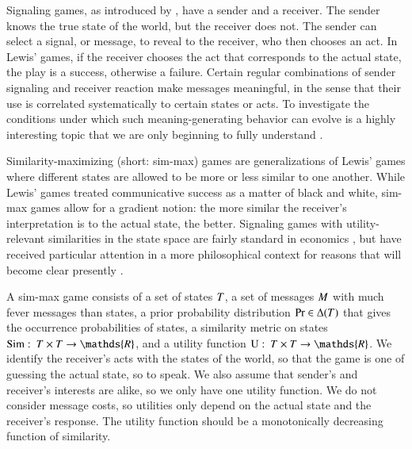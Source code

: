 \documentclass[fleqn,reqno,10pt]{article}
\newcommand{\similarity}{\ensuremath{\mathrm{Sim}}} %
\begin{document}
Signaling games, as introduced by \citet{Lewis_1969:Convention}, have
a sender and a receiver. The sender knows the true state of the world,
but the receiver does not. The sender can select a signal, or message,
to reveal to the receiver, who then chooses an act. In Lewis' games,
if the receiver chooses the act that corresponds to the actual state,
the play is a success, otherwise a failure. Certain regular
combinations of sender signaling and receiver reaction make messages
meaningful, in the sense that their use is correlated systematically
to certain states or acts. To investigate the conditions under which
such meaning-generating behavior can evolve is a highly interesting
topic that we are only beginning to fully understand
\citep[e.g.][]{Warneryd1993:Cheap-Talk-Coor,BlumeKim1993:Evolutionary-St,Huttegger2007:Evolution-and-t,Pawlowitsch2008:Why-Evolution-d,Barrett2009:The-Evolution-o,HutteggerSkyrms2010:Evolutionary-Dy,Skyrms2010:Signals}.

Similarity-maximizing (short: sim-max) games are generalizations of
Lewis' games where different states are allowed to be more or less
similar to one another. While Lewis' games treated communicative
success as a matter of black and white, sim-max games allow for a
gradient notion: the more similar the receiver's interpretation is to
the actual state, the better. Signaling games with utility-relevant
similarities in the state space are fairly standard in economics
\citep[e.g.][]{Spence1973:Job-market-sign,CrawfordSobel1982:Strategic-Infor},
but have received particular attention in a more philosophical context
for reasons that will become clear presently
\citep{Jager2007:The-Evolution-o,JagerRooijvan-Rooij2007:Language-Struct,JagerMetzger2011:Voronoi-Languag}.

A sim-max game consists of a set of states $T$, a set of
messages $M$ with much fever messages than states, a prior
probability distribution $\Pr \in \Delta(T)$ that gives the
occurrence probabilities of states, a similarity metric on states
$\similarity \mycolon \States \times \States \rightarrow \mathds{R}$,
and a utility function $\Utils \mycolon \States \times \States
\rightarrow \mathds{R}$. We identify the receiver's acts with the
states of the world, so that the game is one of guessing the actual
state, so to speak. We also assume that sender's and receiver's
interests are alike, so we only have one utility function. We do not
consider message costs, so utilities only depend on the actual state
and the receiver's response. The utility function should be a
monotonically decreasing function of similarity.
\end{document}

